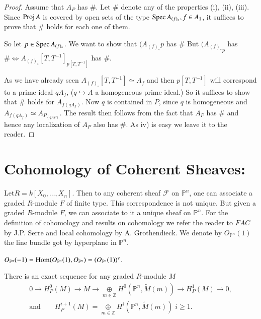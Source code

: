 \begin{proof}
Assume that $A_P$ has \#. Let \# denote any of the properties (i),
(ii), (iii). Since $\operatorname{Proj} A$ is covered by open sets of the type
$\operatorname{Spec} A_{(f)_\circ},f\in A_1$, it suffices to prove that \# holds for
each one of them.

So let $p\in\operatorname{Spec} A_{(f)_{\circ}}$. We want to show that
$(A_{(f)_{\circ}}p$ has \# But ${(A_{(f)_{\circ}}}_p$ has
$\#\Longleftrightarrow A_{(f)_\circ}[T,T^{-1}]_{p[T,T^{-1}]}$ has
  \#.

As we have already seen $A_{(f)_\circ}[T,T^{-1}]\simeq A_f$ and then
$p[T,T^{-1}]$ will correspond to a prime ideal $qA_f$,
($q\hookrightarrow A$ a homogeneous prime ideal.) So it suffices to
show that \# holds for $A_{f(qA_f)}$. Now $q$ is contained in $P$,
since $q$ is homogeneous and $A_{f(qA_f)}\simeq A_{P_{(qAP)}}$. The
  result then follows from the fact that $A_P$ has \# and hence any
  localization of $A_P$ also has \#. As iv) is easy we leave it to the reader.
\end{proof}

\section{Cohomology of Coherent Sheaves:}\label{chap1:sec2}
Let\pageoriginale $R=k[X_0,\ldots,X_n]$.
Then to any coherent sheaf $\mathcal{F}$ on
$\mathbb{P}^n$, one can associate a graded $R$-module $F$ of finite
type. This correspondence is not unique. But given a graded $R$-module
$F$, we can associate to it a unique sheaf on $\mathbb{P}^n$. For the
definition of cohomology and results on cohomology we refer the reader
to $FAC$ by J.P. Serre and local cohomology by A. Grothendieck. We
denote by $O_{\mathbb{P}^n}(1)$ the line bundle got by hyperplane in
$\mathbb{P}^n$. 
\begin{REM*}
$O_{\mathbb{P}^n}(-1)=\operatorname{Hom}(O_{\mathbb{P}^n}(1),O_{\mathbb{P}^n})=
(O_{\mathbb{P}^n}(1))^v$.  
\end{REM*}

\begin{propn}\label{chap1:prop2.1}
There is an exact sequence for any graded $R$-module $M$
\begin{gather*}
0\longrightarrow H_P^0(M)\longrightarrow M\longrightarrow
\underset{m\in\mathbb{Z}}{\oplus}H^0(\mathbb{P}^n,\tilde{M}(m))
\longrightarrow H_P^1(M)\longrightarrow 0,\\
\text{and}\qquad H_P^{i+1}(M)=\underset{m\in\mathbb{Z}}{\oplus}H^i
(\mathbb{P}^n,\tilde{M}(m)) \; i\geq 1.
\end{gather*}
\end{propn}

